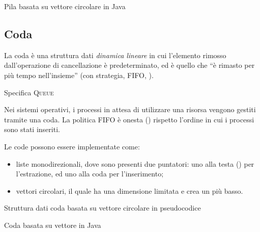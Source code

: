 \begin{listing}[hp]
	\caption{Pila basata su vettore circolare in Java}
	\label{lst:vector-stack}
\end{listing}

\clearpage
\subsection{Coda}

La coda è una struttura dati \emph{dinamica} \emph{lineare} in cui l'elemento rimosso dall'operazione di cancellazione è predeterminato, ed è quello che \enquote{è rimasto per più tempo nell'insieme} (con strategia, \textsc{FIFO}, ).

\begin{algorithm}[H]
	\caption[Specifica coda]{Specifica \textsc{Queue}}
	
\end{algorithm}

Nei sistemi operativi, i processi in attesa di utilizzare una risorsa vengono gestiti tramite una coda.
La politica \textsc{FIFO} è onesta () rispetto l'ordine in cui i processi sono stati inseriti.

Le code possono essere implementate come:
\begin{itemize}
	\item liste monodirezionali, dove sono presenti due puntatori: uno alla testa () per l'estrazione, ed uno alla coda per l'inserimento;
	\item vettori circolari, il quale ha una dimensione limitata e crea un  più basso.
\end{itemize}

\begin{algorithm}[H]
	\caption{Struttura dati coda basata su vettore circolare in pseudocodice}
	
\end{algorithm}

\begin{listing}[hp]
	\caption{Coda basata su vettore in Java}%
	\label{lst:vector-queue}
\end{listing}

\ifsubfile

\fi
